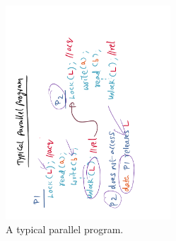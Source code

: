 \documentclass[11pt]{lecture}
\def\fullsize{0.55\textwidth}
\begin{document}
\begin{figure}
\centering
\includegraphics[width=\fullsize,angle=-90]{Figures/typical-parallel-program}
\caption{A typical parallel program.}\label{fig: typical-parallel-program}
\end{figure}
\end{document}
